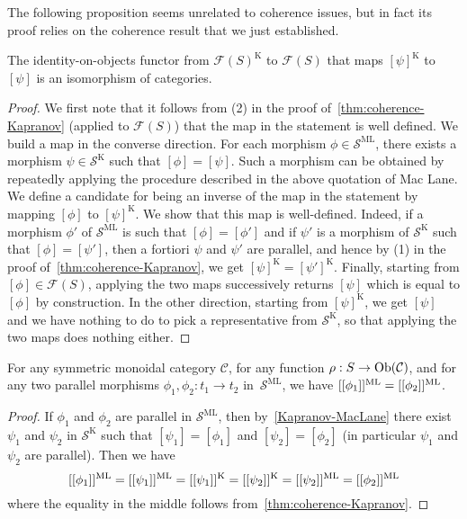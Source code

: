 The following proposition seems unrelated to coherence issues, but in fact its proof relies on the  coherence result that we just established.
\begin{proposition} \label{Kapranov-MacLane}
The identity-on-objects  functor from  $\mathcal{F}(S)^{\mathrm{K}}$ to 
$\mathcal{F}(S)$ that maps $[\psi]^{\mathrm{K}}$ to $[\psi]$ is an isomorphism of categories.
\end{proposition}

\begin{proof}
We first note that it follows from (2) in the proof of~\cref{thm:coherence-Kapranov} (applied to $\mathcal{F}(S)$) that the map in the statement is well defined. We build a map in the converse direction.
 For each morphism $\phi\in\mathcal{S}^{\mathrm{ML}}$, there exists a morphism $\psi\in\mathcal{S}^{\mathrm{K}}$ such that $[\phi]=[\psi]$. Such a morphism can be obtained by repeatedly applying the procedure described in the above quotation of Mac Lane.  We define a candidate for being an inverse of the map in the statement by mapping $[\phi]$ to $[\psi]^{\mathrm{K}}$. We show that this  map is well-defined. Indeed, if  a morphism $\phi'$ of  $\mathcal{S}^{\mathrm{ML}}$ is such that $[\phi]=[\phi']$ and if $\psi'$ is a morphism of $\mathcal{S}^{\mathrm{K}}$ such that $[\phi]=[\psi']$, then a fortiori $\psi$ and $\psi'$ are parallel, and hence by (1) in the proof of~\cref{thm:coherence-Kapranov}, we get  $[\psi]^{\mathrm{K}}=[\psi']^{\mathrm{K}}$. 
 Finally, starting from  $[\phi]\in\mathcal{F}(S)$, applying the two maps successively returns  $[\psi]$ which is equal to $[\phi]$ by construction. In the other direction, starting from $[\psi]^{\mathrm{K}}$, we get $[\psi]$ and  we have nothing to do to pick a representative from $\mathcal{S}^{\mathrm{K}}$, so that applying the two maps does nothing either.
\end{proof}

\begin{thm}
\label{thm:coherence-MacLane}
    For any symmetric monoidal category $\mathcal{C}$, for any  function $\rho : S \to \mathrm{Ob}(\mathcal{C})$, and for any two parallel morphisms $\phi_1,\phi_2: t_1 \to t_2$ in~$\mathcal{S}^{\mathrm{ML}}$, we have $[[\phi_1]]^{\mathrm{ML}}=[[\phi_2]]^{\mathrm{ML}}$.
\end{thm}
\begin{proof} 
If $\phi_1$ and $\phi_2$ are parallel in $\mathcal{S}^{\mathrm{ML}}$, then by~\cref{Kapranov-MacLane}
there exist $\psi_1$ and $\psi_2$ in $\mathcal{S}^{\mathrm{K}}$ such that $[\psi_1]=[\phi_1]$ and 
$[\psi_2]=[\phi_2]$
 (in particular $\psi_1$ and $\psi_2$ are parallel).
Then we have  
$$[[\phi_1]]^{\mathrm{ML}} = [[\psi_1]]^{\mathrm{ML}}= [[\psi_1]]^{\mathrm{K}} 
=  [[\psi_2]]^{\mathrm{K}} 
 =  [[\psi_2]]^{\mathrm{ML}}  =  [[\phi_2]]^{\mathrm{ML}}$$ 
 where the equality in the middle 
follows from~\cref{thm:coherence-Kapranov}.
\end{proof}


